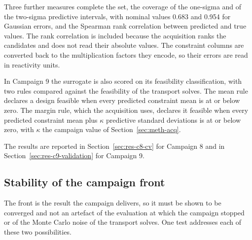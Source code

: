 Three further measures complete the set, the coverage of the one-sigma
and of the two-sigma predictive intervals, with nominal values 0.683 and
0.954 for Gaussian errors, and the Spearman rank correlation between
predicted and true values. The rank correlation is included because the
acquisition ranks the candidates and does not read their absolute
values. The constraint columns are converted back to the multiplication
factors they encode, so their errors are read in reactivity units.

In Campaign 9 the surrogate is also scored on its feasibility
classification, with two rules compared against the feasibility of the
transport solves. The mean rule declares a design feasible when every
predicted constraint mean is at or below zero. The margin rule, which
the acquisition uses, declares it feasible when every predicted
constraint mean plus $\kappa$ predictive standard deviations is at or
below zero, with $\kappa$ the campaign value of
Section~\ref{sec:meth-acq}.

The results are reported in Section~\ref{sec:res-c8-cv} for Campaign 8
and in Section~\ref{sec:res-c9-validation} for Campaign 9.

\subsection{Stability of the campaign front}
\label{sec:validation-front}

The front is the result the campaign delivers, so it must be shown to
be converged and not an artefact of the evaluation at which the
campaign stopped or of the Monte Carlo noise of the transport solves.
One test addresses each of these two possibilities.

